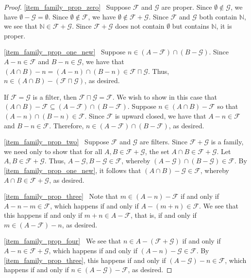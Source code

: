 \documentclass[letter,11pt]{article}
\theoremstyle{plain}
\theoremstyle{definition}
\theoremstyle{plain}
\theoremstyle{plain}
\numberwithin{equation}{section}
\newcommand{\N}{\mathbb{N}}
\newcommand{\filter}{\mathscr{F}}
\newcommand{\filtertwo}{\mathscr{G}}
\newcommand{\classcap}{\sqcap}
\newcommand{\family}{\mathscr{F}}
\newcommand{\familytwo}{\mathscr{G}}
\begin{document}
\begin{proof}
    \eqref{item_family_prop_zero} \ Suppose $\family$ and $\familytwo$ are proper.  Since $\emptyset \not\in \familytwo$, we have $\emptyset - \familytwo = \emptyset$. Since $\emptyset \not\in \family$, we have $\emptyset \not\in \family + \familytwo$. Since $\family$ and $\familytwo$ both contain $\N$, we see that $\N \in \family + \familytwo$.  Since $\family + \familytwo$ does not contain $\emptyset$ but contains $\N$, it is proper.
    
    \eqref{item_family_prop_one_new} \  Suppose $n \in (A - \filter) \cap (B - \filtertwo)$.  Since $A - n \in \filter$ and $B - n \in \filtertwo$, we have that $(A \cap B) - n = (A-n) \cap (B-n) \in \filter \classcap \filtertwo$.  Thus, $n \in (A \cap B) - (\filter \classcap \filtertwo)$, as desired.

    If $\family = \familytwo$ is a filter, then $\family \classcap \familytwo = \family$.  We wish to show in this case that $(A \cap B) - \family \subseteq (A- \family) \cap (B-\family)$.  Suppose $n \in (A \cap B) - \family$ so that $(A - n) \cap (B-n) \in \family$.  Since $\family$ is upward closed, we have that $A -n \in \family$ and $B-n \in \family$.  Therefore, $n \in (A - \family) \cap (B-\family)$, as desired.

    \eqref{item_family_prop_two} \ Suppose $\filter$ and $\filtertwo$ are filters.  Since $\filter + \filtertwo$ is a family, we need only to show that for all $A, B \in \filter + \filtertwo$, the set $A \cap B \in \filter + \filtertwo$.  Let $A, B \in \filter + \filtertwo$.  Thus, $A - \filtertwo, B - \filtertwo \in \filter$, whereby $(A-\filtertwo) \cap (B-\filtertwo) \in \filter$.  By \eqref{item_family_prop_one_new}, it follows that $(A \cap B) - \filtertwo \in \filter$, whereby $A \cap B \in \filter + \filtertwo$, as desired.

    \eqref{item_family_prop_three} \ Note that $m \in (A -n) - \filter$ if and only if $A-n-m \in \filter$, which happens if and only if $A-(m+n) \in \filter$.  We see that this happens if and only if $m+n \in A-\filter$, that is, if and only if $m \in (A-\filter) - n$, as desired.

    \eqref{item_family_prop_four} \ We see that $n \in A - (\filter + \filtertwo)$ if and only if $A-n \in \filter + \filtertwo$, which happens if and only if $(A-n) - \filtertwo \in \filter$.  By \eqref{item_family_prop_three}, this happens if and only if $(A-\filtertwo) - n \in \filter$, which happens if and only if $n \in (A - \filtertwo) - \filter$, as desired.


\end{proof}
\end{document}
